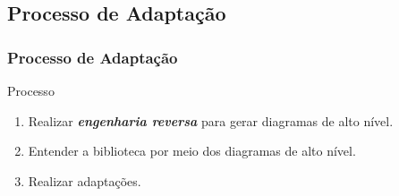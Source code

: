 \subsection{Processo de Adaptação}
\begin{frame}
 \frametitle{Processo de Adaptação}

  \begin{block}{Processo}

    \begin{enumerate}

     \item Realizar \emph{\textbf{engenharia reversa}} para gerar diagramas de alto nível.

     \item Entender a biblioteca por meio dos diagramas de alto nível.

     \item Realizar adaptações.

    \end{enumerate}

  \end{block}
  
\end{frame}


